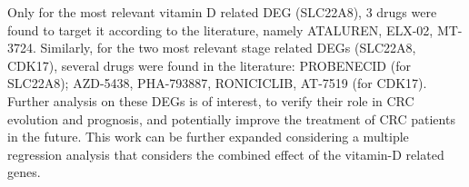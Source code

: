 \documentclass[fleqn,10pt]{SelfArx} %
\begin{document}
	Only for the most relevant vitamin D related DEG (SLC22A8), 3 drugs were found to target it according to the literature, namely ATALUREN, ELX-02, MT-3724. Similarly, for the two most relevant stage related DEGs (SLC22A8, CDK17), several drugs were found in the literature: PROBENECID (for SLC22A8); AZD-5438, PHA-793887, RONICICLIB, AT-7519 (for CDK17). \\
	Further analysis on these DEGs is of interest, to verify their role in CRC evolution and prognosis, and potentially improve the treatment of CRC patients in the future.
	This work can be further expanded considering a multiple regression analysis that considers the combined effect of the vitamin-D related genes.





\end{document}
